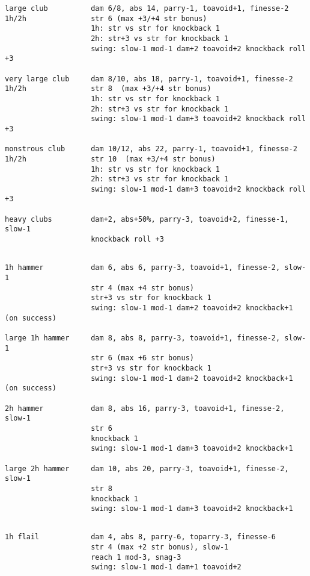 \begin{verbatim}
large club          dam 6/8, abs 14, parry-1, toavoid+1, finesse-2
1h/2h               str 6 (max +3/+4 str bonus)
                    1h: str vs str for knockback 1
                    2h: str+3 vs str for knockback 1
                    swing: slow-1 mod-1 dam+2 toavoid+2 knockback roll +3

very large club     dam 8/10, abs 18, parry-1, toavoid+1, finesse-2
1h/2h               str 8  (max +3/+4 str bonus)
                    1h: str vs str for knockback 1
                    2h: str+3 vs str for knockback 1
                    swing: slow-1 mod-1 dam+3 toavoid+2 knockback roll +3

monstrous club      dam 10/12, abs 22, parry-1, toavoid+1, finesse-2
1h/2h               str 10  (max +3/+4 str bonus)
                    1h: str vs str for knockback 1
                    2h: str+3 vs str for knockback 1
                    swing: slow-1 mod-1 dam+3 toavoid+2 knockback roll +3

heavy clubs         dam+2, abs+50%, parry-3, toavoid+2, finesse-1, slow-1
                    knockback roll +3


\end{verbatim} \goodbreak \begin{verbatim}
1h hammer           dam 6, abs 6, parry-3, toavoid+1, finesse-2, slow-1
                    str 4 (max +4 str bonus)
                    str+3 vs str for knockback 1
                    swing: slow-1 mod-1 dam+2 toavoid+2 knockback+1 (on success)

large 1h hammer     dam 8, abs 8, parry-3, toavoid+1, finesse-2, slow-1
                    str 6 (max +6 str bonus)
                    str+3 vs str for knockback 1
                    swing: slow-1 mod-1 dam+2 toavoid+2 knockback+1 (on success)

2h hammer           dam 8, abs 16, parry-3, toavoid+1, finesse-2, slow-1
                    str 6
                    knockback 1
                    swing: slow-1 mod-1 dam+3 toavoid+2 knockback+1

large 2h hammer     dam 10, abs 20, parry-3, toavoid+1, finesse-2, slow-1
                    str 8
                    knockback 1
                    swing: slow-1 mod-1 dam+3 toavoid+2 knockback+1


\end{verbatim} \goodbreak \begin{verbatim}
1h flail            dam 4, abs 8, parry-6, toparry-3, finesse-6
                    str 4 (max +2 str bonus), slow-1
                    reach 1 mod-3, snag-3
                    swing: slow-1 mod-1 dam+1 toavoid+2


\end{verbatim}
